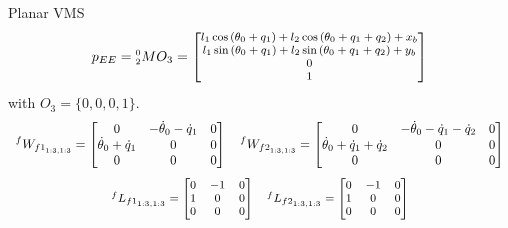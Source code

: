\begin{frame}{Planar VMS}
    \begin{equation}
        \begin{footnotesize}
        p_{EE}=\prescript{0}{2}{M}O_3= \begin{bmatrix}
          l_1\cos{(\theta_0+q_1)}+l_2\cos{(\theta_0+q_1+q_2)}+x_b\\
          l_1\sin{(\theta_0+q_1)}+l_2\sin{(\theta_0+q_1+q_2)}+y_b\\0\\1
         \end{bmatrix}
        \end{footnotesize}
      \end{equation}
with $O_3=\{0,0,0,1\}$.
  \begin{equation}
    \begin{array}{c}
      \prescript{f}{}{W_{{f1}_{1:3,1:3}}}=\begin{bmatrix}
        0&-\dot{\theta}_0-\dot{q}_1&0\\
        \dot{\theta}_0+\dot{q}_1&0&0\\
        0&0&0
      \end{bmatrix} \quad
      \prescript{f}{}{W_{{f2}_{1:3,1:3}}}=\begin{bmatrix}
        0&-\dot{\theta}_0-\dot{q}_1-\dot{q}_2&0\\
        \dot{\theta}_0+\dot{q}_1+\dot{q}_2&0&0\\
        0&0&0
      \end{bmatrix}
    \end{array}
  \end{equation}
  \begin{equation}
  \begin{footnotesize}
    \begin{array}{c}
      \prescript{f}{}{L_{{f1}_{1:3,1:3}}}=\begin{bmatrix}
        0&-1&0\\
        1&0&0\\
        0&0&0
      \end{bmatrix} \quad
      \prescript{f}{}{L_{{f2}_{1:3,1:3}}}=\begin{bmatrix}
        0&-1&0\\
        1&0&0\\
        0&0&0
      \end{bmatrix}
    \end{array}
    \end{footnotesize}
  \end{equation}
\end{frame}

